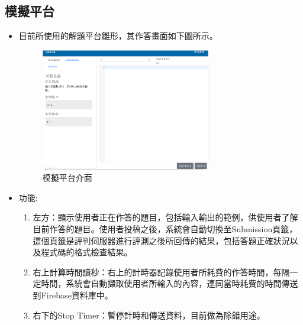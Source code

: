 \subsection{模擬平台}
\begin{itemize}
	\item 目前所使用的解題平台雛形，其作答畫面如下圖所示。
	\begin{figure}[H]
		\centering
		\includegraphics[width=0.7\textwidth]{web_part.png}
		\caption{模擬平台介面}
		\label{Fig.3.2}
	\end{figure}
	\item 功能:\\
	\begin{enumerate}[1.]
		\item 左方：顯示使用者正在作答的題目，包括輸入輸出的範例，供使用者了解目前作答的題目。使用者投稿之後，系統會自動切換至Submission頁籤，這個頁籤是評判伺服器進行評測之後所回傳的結果，包括答題正確狀況以及程式碼的格式檢查結果。
		\item 右上計算時間讀秒：右上的計時器記錄使用者所耗費的作答時間，每隔一定時間，系統會自動擷取使用者所輸入的內容，連同當時耗費的時間傳送到Firebase資料庫中。
		\item 右下的Stop Timer：暫停計時和傳送資料，目前做為除錯用途。
	\end{enumerate}
\end{itemize}

